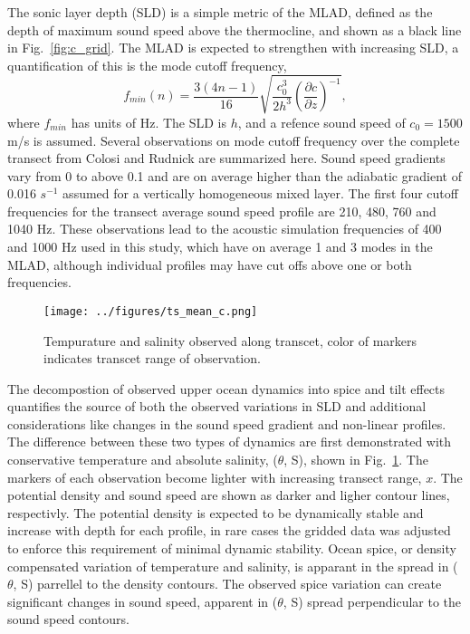 \documentclass[preprint,NumberedRefs]{JASA}
\begin{document}
The sonic layer depth (SLD) is a simple metric of the MLAD, defined as the depth of maximum sound speed above the thermocline, and shown as a black line in Fig.~\ref{fig:c_grid}. The MLAD is expected to strengthen with increasing SLD, a quantification of this is the mode cutoff frequency\citep{Urick1982Prop},
\begin{equation}
    f_{min}(n) = \frac{3(4n-1)}{16} \sqrt{\frac{c_0^3}{2h^3} \left( \frac{\partial c}{\partial z} \right) ^ {-1}},
    \label{eq:f_cutoff}
\end{equation}
where $f_{min}$ has units of Hz. The SLD is $h$, and a refence sound speed of $c_0 = 1500$ m/s is assumed. Several observations on mode cutoff frequency over the complete transect from Colosi and Rudnick\cite{colosi2020observations} are summarized here. Sound speed gradients vary from 0 to above 0.1 and are on average higher than the adiabatic gradient of 0.016 $s^{-1}$ assumed for a vertically homogeneous mixed layer. The first four cutoff frequencies for the transect average sound speed profile are 210, 480, 760 and 1040 Hz. These observations lead to the acoustic simulation frequencies of 400 and 1000 Hz used in this study, which have on average 1 and 3 modes in the MLAD, although individual profiles may have cut offs above one or both frequencies.

\begin{figure}
\texttt{[image: ../figures/ts\_mean\_c.png]}
\caption{\label{fig:ts_diagram}{Tempurature and salinity observed along transcet, color of markers indicates transcet range of observation.}}
\end{figure}
The decompostion of observed upper ocean dynamics into spice and tilt effects quantifies the source of both the observed variations in SLD and additional considerations like changes in the sound speed gradient and non-linear profiles. The difference between these two types of dynamics are first demonstrated with conservative temperature and absolute salinity, ($\theta$, S), shown in Fig.~\ref{fig:ts_diagram}. The markers of each observation become lighter with increasing transect range, $x$. The potential density and sound speed are shown as darker and ligher contour lines, respectivly. The potential density is expected to be dynamically stable and increase with depth for each profile, in rare cases the gridded data was adjusted to enforce this requirement of minimal dynamic stability\citep{barker2017stabilizing}. Ocean spice, or density compensated variation of temperature and salinity, is apparant in the spread in ($\theta$, S) parrellel to the density contours. The observed spice variation can create significant changes in sound speed, apparent in ($\theta$, S) spread perpendicular to the sound speed contours.
\end{document}
